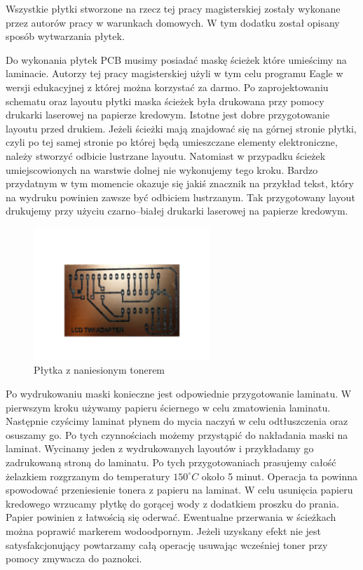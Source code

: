 \label{chap:pcb}
Wszystkie płytki stworzone na rzecz tej pracy magisterskiej zostały wykonane przez autorów pracy w warunkach domowych. W tym dodatku został opisany sposób wytwarzania płytek.

Do wykonania płytek PCB musimy posiadać maskę ścieżek które umieścimy na laminacie. Autorzy tej pracy magisterskiej użyli w tym celu programu Eagle w wersji edukacyjnej z której można korzystać za darmo. Po zaprojektowaniu schematu oraz layoutu płytki maska ścieżek była drukowana przy pomocy drukarki laserowej na papierze kredowym. Istotne jest dobre przygotowanie layoutu przed drukiem. Jeżeli ścieżki mają znajdować się na górnej stronie płytki, czyli po tej samej stronie po której będą umieszczane elementy elektroniczne, należy stworzyć odbicie lustrzane layoutu. Natomiast w przypadku ścieżek umiejscowionych na warstwie dolnej nie wykonujemy tego kroku. Bardzo przydatnym w tym momencie okazuje się jakiś znacznik na przykład tekst, który na wydruku powinien zawsze być odbiciem lustrzanym. Tak przygotowany layout drukujemy przy użyciu czarno--białej drukarki laserowej na papierze kredowym.

\begin{figure}[!ht]
 \centering
 \includegraphics[height=50mm]{../images/appendix/toner.JPG}
 \caption{Płytka z naniesionym tonerem}
 \label{fig:PlytkaZTonerem}
\end{figure}

Po wydrukowaniu maski konieczne jest odpowiednie przygotowanie laminatu. W pierwszym kroku używamy papieru ściernego w celu zmatowienia laminatu. Następnie czyścimy laminat płynem do mycia naczyń w celu odtłuszczenia oraz osuszamy go. Po tych czynnościach możemy przystąpić do nakładania maski na laminat. Wycinamy jeden z wydrukowanych layoutów i przykładamy go zadrukowaną stroną do laminatu. Po tych przygotowaniach prasujemy całość żelazkiem rozgrzanym do temperatury $150^{\circ}C$ około 5 minut. Operacja ta powinna spowodować przeniesienie tonera z papieru na laminat. W celu usunięcia papieru kredowego wrzucamy płytkę do gorącej wody z dodatkiem proszku do prania. Papier powinien z łatwością się oderwać. Ewentualne przerwania w ścieżkach można poprawić markerem wodoodpornym. Jeżeli uzyskany efekt nie jest satysfakcjonujący powtarzamy całą operację usuwając wcześniej toner przy pomocy zmywacza do paznokci.

